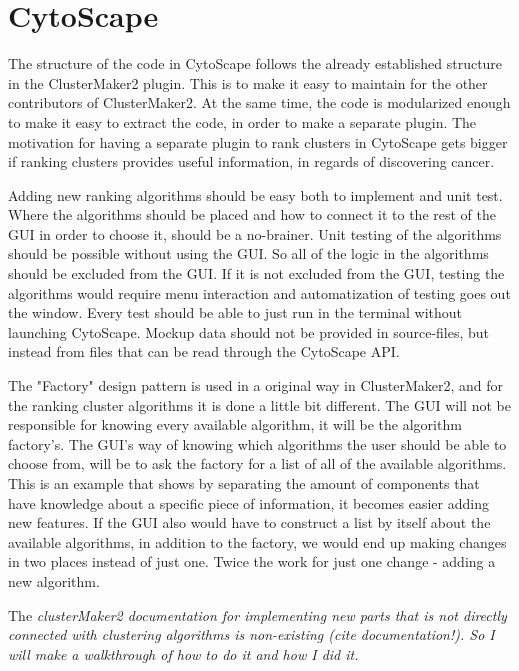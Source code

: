 \documentclass[UKenglish,11pt,a4paper]{article}
\begin{document}
\part{CytoScape} %
The structure of the code in CytoScape follows the already established structure in the ClusterMaker2 plugin. This is to
make it easy to maintain for the other contributors of ClusterMaker2. At the same time, the code is modularized enough
to make it easy to extract the code, in order to make a separate plugin. The motivation for having a separate plugin to
rank clusters in CytoScape gets bigger if ranking clusters provides useful information, in regards of discovering
cancer.

Adding new ranking algorithms should be easy both to implement and unit test. Where the algorithms should be placed and
how to connect it to the rest of the GUI in order to choose it, should be a no-brainer. Unit testing of the algorithms
should be possible without using the GUI. So all of the logic in the algorithms should be excluded from the GUI. If it
is not excluded from the GUI, testing the algorithms would require menu interaction and automatization of testing goes
out the window. Every test should be able to just run in the terminal without launching CytoScape. Mockup data %
should not be provided in source-files, but instead from files that can be read through the CytoScape API. %

The "Factory" design pattern %
is used in a original way in ClusterMaker2, and for the ranking cluster algorithms it is done a little bit different.
The GUI will not be responsible for knowing every available algorithm, it will be the algorithm factory's. The GUI's way
of knowing which algorithms the user should be able to choose from, will be to ask the factory for a list of all of the
available algorithms. This is an example that shows by separating the amount of components that have knowledge about a
specific piece of information, it becomes easier adding new features. If the GUI also would have to construct a list by
itself about the available algorithms, in addition to the factory, we would end up making changes in two places instead
of just one. Twice the work for just one change - adding a new algorithm.


The \it{clusterMaker2} documentation for implementing new parts that is not directly connected with clustering
algorithms is non-existing (cite documentation!). So I will make a walkthrough of how to do it and how I did it.
\end{document}
